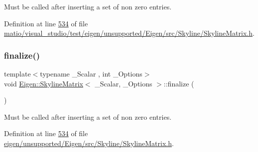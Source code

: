 Must be called after inserting a set of non zero entries. 

Definition at line \hyperlink{matio_2visual__studio_2test_2eigen_2unsupported_2_eigen_2src_2_skyline_2_skyline_matrix_8h_source_l00534}{534} of file \hyperlink{matio_2visual__studio_2test_2eigen_2unsupported_2_eigen_2src_2_skyline_2_skyline_matrix_8h_source}{matio/visual\+\_\+studio/test/eigen/unsupported/\+Eigen/src/\+Skyline/\+Skyline\+Matrix.\+h}.

\mbox{\label{class_eigen_1_1_skyline_matrix_a1269310d041fb3ca2a980644f3cfe5a2}} 
\subsubsection{\texorpdfstring{finalize()}{finalize()}\hspace{0.1cm}{\footnotesize\ttfamily [2/2]}}
{\footnotesize\ttfamily template$<$typename \+\_\+\+Scalar , int \+\_\+\+Options$>$ \\
void \hyperlink{class_eigen_1_1_skyline_matrix}{Eigen\+::\+Skyline\+Matrix}$<$ \+\_\+\+Scalar, \+\_\+\+Options $>$\+::finalize (\begin{DoxyParamCaption}{ }\end{DoxyParamCaption})\hspace{0.3cm}{\ttfamily [inline]}}

Must be called after inserting a set of non zero entries. 

Definition at line \hyperlink{eigen_2unsupported_2_eigen_2src_2_skyline_2_skyline_matrix_8h_source_l00534}{534} of file \hyperlink{eigen_2unsupported_2_eigen_2src_2_skyline_2_skyline_matrix_8h_source}{eigen/unsupported/\+Eigen/src/\+Skyline/\+Skyline\+Matrix.\+h}.

\mbox{\label{class_eigen_1_1_skyline_matrix_a6e2d550f29d0dd59f83aa9d568d92c23}} 
